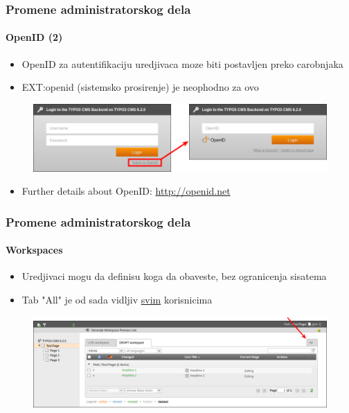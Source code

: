 
\begin{frame}[fragile]
	\frametitle{Promene administratorskog dela}
	\framesubtitle{OpenID (2)}

 	\begin{itemize}
		\item OpenID za autentifikaciju uredjivaca moze biti postavljen preko carobnjaka
		\item EXT:openid (sistemsko prosirenje) je neophodno za ovo
	\end{itemize}

	\begin{figure}
		\includegraphics[width=0.8\linewidth]{Images/BackendChanges/OpenIdLogin.png}
	\end{figure}

 	\begin{itemize}
		\item Further details about OpenID:\newline
			\small\url{http://openid.net}\normalsize
	\end{itemize}

\end{frame}


\begin{frame}[fragile]
	\frametitle{Promene administratorskog dela}
	\framesubtitle{Workspaces}

 	\begin{itemize}
		\item Uredjivaci mogu da definisu koga da obaveste, bez ogranicenja sisatema
		\item Tab "All" je od sada vidljiv \underline{svim} korisnicima
	\end{itemize}

	\begin{figure}
		\includegraphics[width=0.95\linewidth]{Images/BackendChanges/WorkspacesTabAll.png}
	\end{figure}

\end{frame}

